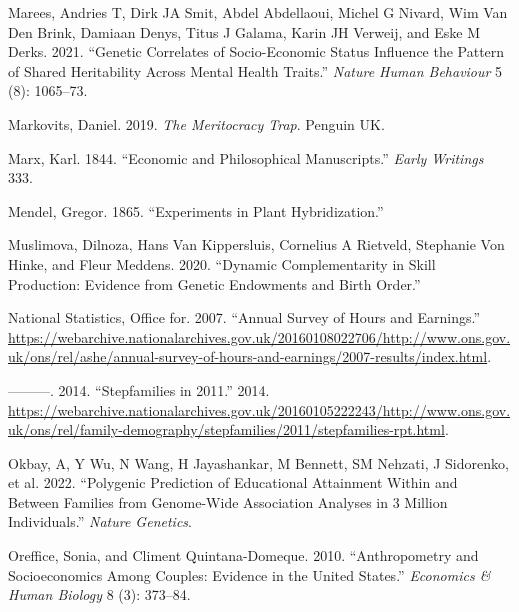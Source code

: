 \documentclass[
  12pt,
]{article}
\newlength{\cslhangindent}
\newlength{\cslentryspacingunit} %
\newenvironment{CSLReferences}[2] %
 {%
  \setlength{\parindent}{0pt}
  \ifodd #1
  \let\oldpar\par
  \def\par{\hangindent=\cslhangindent\oldpar}
  \fi
  \setlength{\parskip}{#2\cslentryspacingunit}
 }%
 {}
\theoremstyle{definition}
\theoremstyle{definition}
\theoremstyle{definition}
\theoremstyle{definition}
\theoremstyle{remark}
\begin{document}
\begin{CSLReferences}{1}{0}
\leavevmode{}%
Marees, Andries T, Dirk JA Smit, Abdel Abdellaoui, Michel G Nivard, Wim Van Den Brink, Damiaan Denys, Titus J Galama, Karin JH Verweij, and Eske M Derks. 2021. {``Genetic Correlates of Socio-Economic Status Influence the Pattern of Shared Heritability Across Mental Health Traits.''} \emph{Nature Human Behaviour} 5 (8): 1065--73.

\leavevmode{}%
Markovits, Daniel. 2019. \emph{The Meritocracy Trap}. Penguin UK.

\leavevmode{}%
Marx, Karl. 1844. {``Economic and Philosophical Manuscripts.''} \emph{Early Writings} 333.

\leavevmode{}%
Mendel, Gregor. 1865. {``Experiments in Plant Hybridization.''}

\leavevmode{}%
Muslimova, Dilnoza, Hans Van Kippersluis, Cornelius A Rietveld, Stephanie Von Hinke, and Fleur Meddens. 2020. {``Dynamic Complementarity in Skill Production: Evidence from Genetic Endowments and Birth Order.''}

\leavevmode{}%
National Statistics, Office for. 2007. {``Annual Survey of Hours and Earnings.''} \url{https://webarchive.nationalarchives.gov.uk/20160108022706/http://www.ons.gov.uk/ons/rel/ashe/annual-survey-of-hours-and-earnings/2007-results/index.html}.

\leavevmode{}%
---------. 2014. {``Stepfamilies in 2011.''} 2014. \url{https://webarchive.nationalarchives.gov.uk/20160105222243/http://www.ons.gov.uk/ons/rel/family-demography/stepfamilies/2011/stepfamilies-rpt.html}.

\leavevmode{}%
Okbay, A, Y Wu, N Wang, H Jayashankar, M Bennett, SM Nehzati, J Sidorenko, et al. 2022. {``Polygenic Prediction of Educational Attainment Within and Between Families from Genome-Wide Association Analyses in 3 Million Individuals.''} \emph{Nature Genetics}.

\leavevmode{}%
Oreffice, Sonia, and Climent Quintana-Domeque. 2010. {``Anthropometry and Socioeconomics Among Couples: Evidence in the United States.''} \emph{Economics \& Human Biology} 8 (3): 373--84.


\end{CSLReferences}
\end{document}
